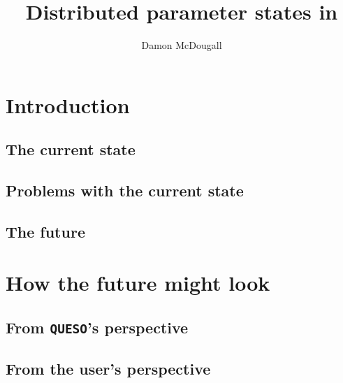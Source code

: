 \documentclass[12pt,letterpaper,oneside,onecolumn,portrait]{article}
\title{Distributed parameter states in \Queso}
\author{Damon McDougall}
\newcommand{\Queso}{\texttt{QUESO}}
\begin{document}
\maketitle

\section{Introduction}
\subsection{The current state}
\subsection{Problems with the current state}
\subsection{The future}

\section{How the future might look}

\subsection{From \Queso's perspective}
\subsection{From the user's perspective}
\end{document}
